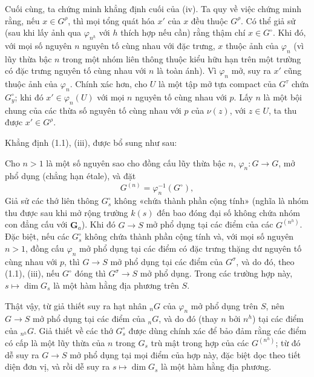 Cuối cùng, ta chứng minh khẳng định cuối của (iv). Ta quy về việc chứng minh
rằng, nếu $x\in G^\rho$, thì mọi tổng quát hóa $x'$ của $x$ đều thuộc
$G^\rho$. Có thể giả sử (sau khi lấy ảnh qua $\varphi_{n^h}$ với $h$ thích
hợp nếu cần) rằng thậm chí $x\in G^\circ$. Khi đó, với mọi số nguyên $n$
nguyên tố cùng nhau với đặc trưng, $x$ thuộc ảnh của $\varphi_n$ (vì lũy thừa
bậc $n$ trong một nhóm liên thông thuộc kiểu hữu hạn trên một trường có đặc
trưng nguyên tố cùng nhau với $n$ là toàn ánh). Vì $\varphi_n$ mở, suy ra $x'$
cũng thuộc ảnh của $\varphi_n$. Chính xác hơn, cho $U$ là một tập mở tựa
compact của $G^\tau$ chứa $G_y^\circ$; khi đó
$x'\in\varphi_n(U)$ với mọi $n$ nguyên tố cùng nhau với $p$. Lấy $n$ là một
bội chung của các thừa số nguyên tố cùng nhau với $p$ của $\nu(z)$, với
$z\in U$, ta thu được $x'\in G^\rho$.

Khẳng định (1.1), (iii), được bổ sung như sau:

 Cho $n>1$ là một số nguyên sao cho đồng cấu lũy thừa bậc
$n$, $\varphi_n:G\longrightarrow G$, mở phổ dụng (chẳng hạn étale), và đặt
\[
G^{(n)}=\varphi_n^{-1}(G^\circ),
\]
Giả sử các thớ liên thông $G_s^\circ$ không «chứa
thành phần cộng tính» (nghĩa là nhóm thu được sau khi mở rộng trường $k(s)$
đến bao đóng đại số không chứa nhóm con đẳng cấu với $\mathbf G_a$). Khi đó
$G\longrightarrow S$ mở phổ dụng tại các điểm của các $G^{(n^h)}$. Đặc biệt,
nếu các $G_s^\circ$ không chứa thành phần cộng tính và, với mọi số nguyên
$n>1$, đồng cấu $\varphi_n$ mở phổ dụng tại các điểm có đặc trưng thặng dư
nguyên tố cùng nhau với $p$, thì $G\longrightarrow S$ mở phổ dụng tại các điểm của $G^\sigma$, và
do đó, theo (1.1), (iii), nếu $G^\circ$ đóng thì
$G^\sigma\longrightarrow S$ mở phổ dụng. Trong các trường hợp này,
$s\longmapsto\dim G_s$ là một hàm hằng địa phương trên $S$.

Thật vậy, từ giả thiết suy ra hạt nhân ${}_nG$ của $\varphi_n$ mở phổ dụng
trên $S$, nên $G\longrightarrow S$ mở phổ dụng tại các điểm của ${}_nG$, và
do đó (thay $n$ bởi $n^h$) tại các điểm của ${}_{n^h}G$. Giả thiết về các thớ
$G_s^\circ$ được dùng chính xác để bảo đảm rằng các điểm có cấp là một lũy
thừa của $n$ trong $G_s$ trù mật trong hợp của các $G^{(n^h)}$; từ đó dễ suy
ra $G\longrightarrow S$ mở phổ dụng tại mọi điểm của hợp này, đặc biệt dọc
theo tiết diện đơn vị, và rồi dễ suy ra $s\longmapsto\dim G_s$ là một hàm
hằng địa phương.

